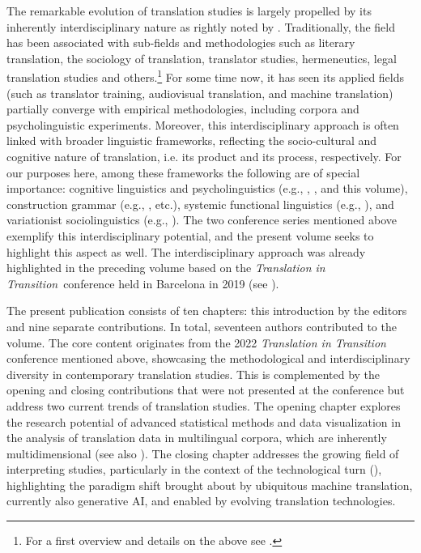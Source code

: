 \documentclass[output=paper]{langscibook}
\begin{document}
The remarkable evolution of translation studies is largely propelled by its inherently interdisciplinary nature as rightly noted by \citealt{GrangerLefer2022}. Traditionally, the field has been associated with sub-fields and methodologies such as literary translation, the sociology of translation, translator studies, hermeneutics, legal translation studies and others.\footnote{For a first overview and details on the above see \citet{BakerSaldanha2019}.} For some time now, it has seen its applied fields (such as translator training, audiovisual translation, and machine translation) partially converge with empirical methodologies, including corpora and psycholinguistic experiments. Moreover, this interdisciplinary approach is often linked with broader linguistic frameworks, reflecting the socio-cultural and cognitive nature of translation, i.e. its product and its process, respectively. For our purposes here, among these frameworks the following are of special importance: cognitive linguistics and psycholinguistics (e.g., \citealt{Halverson2017}, \citealt{Carl2021}, and this volume), construction grammar (e.g., \citealt{CzuloEtAl2023}, etc.), systemic functional linguistics (e.g., \citealt{NeumannEtAl2017}), and variationist sociolinguistics (e.g., \citealt{PrieelsSutter2018}). The two conference series mentioned above exemplify this interdisciplinary potential, and the present volume seeks to highlight this aspect as well. The interdisciplinary approach was already highlighted in the preceding volume based on the \textit{Translation in Transition} conference held in Barcelona in 2019 (see \citealt{Bisiada2021}).

The present publication consists of ten chapters: this introduction by the editors and nine separate contributions. In total, seventeen authors contributed to the volume. {The core content originates from the 2022 \textit{Translation in Transition} conference mentioned above, showcasing the methodological and interdisciplinary diversity in contemporary translation studies. This is complemented by the opening and closing contributions that were not presented at the conference but address two current trends of translation studies. The opening chapter explores the research potential of advanced statistical methods and data visualization in the analysis of translation data in multilingual corpora, which are inherently multidimensional (see also   \citealt{DeSutterLefer2019}). The closing chapter addresses the growing field of interpreting studies, particularly in the context of the technological turn (}\citealt{Jimenez-Crespo2020}{), highlighting the paradigm shift brought about by ubiquitous machine translation, currently also generative AI, and enabled by evolving translation technologies.}
\end{document}
